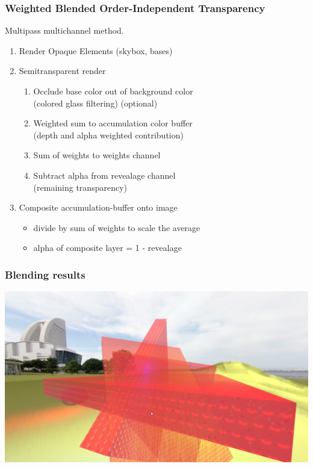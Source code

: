 \documentclass[12pt]{beamer}
\begin{document}
    \begin{frame}
        \frametitle{Weighted Blended Order-Independent Transparency}

        Multipass multichannel method.

        \begin{enumerate}
            \item Render Opaque Elements (skybox, bases)
            \item Semitransparent render
            \begin{enumerate}
                \item Occlude base color out of background color \\ (colored glass filtering) (optional)
                \item Weighted sum to accumulation color buffer \\ (depth and alpha weighted contribution)
                \item Sum of weights to weights channel
                \item Subtract alpha from revealage channel \\ (remaining transparency)
            \end{enumerate}
            \item Composite accumulation-buffer onto image
            \begin{itemize}
                \item divide by sum of weights to scale the average
                \item alpha of composite layer = 1 - revealage
            \end{itemize}
        \end{enumerate}
    \end{frame}

    \begin{frame}
        \frametitle{Blending results}
        \includegraphics[width=\textwidth]{blending}
    \end{frame}
\end{document}

